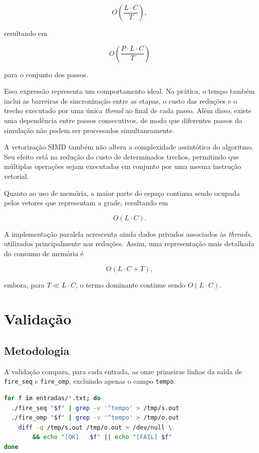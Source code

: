 \documentclass[11pt,a4paper]{article}
\begin{document}
$$
O\left(\frac{L \cdot C}{T}\right),
$$

resultando em

$$
O\left(\frac{P \cdot L \cdot C}{T}\right)
$$

para o conjunto dos passos.

Essa expressão representa um comportamento ideal. Na prática, o tempo também inclui as barreiras de sincronização entre as etapas, o custo das reduções e o trecho executado por uma única \emph{thread} ao final de cada passo. Além disso, existe uma dependência entre passos consecutivos, de modo que diferentes passos da simulação não podem ser processados simultaneamente.

A vetorização SIMD também não altera a complexidade assintótica do algoritmo. Seu efeito está na redução do custo de determinados trechos, permitindo que múltiplas operações sejam executadas em conjunto por uma mesma instrução vetorial.

Quanto ao uso de memória, a maior parte do espaço continua sendo ocupada pelos vetores que representam a grade, resultando em

$$
O(L \cdot C).
$$

A implementação paralela acrescenta ainda dados privados associados às \emph{threads}, utilizados principalmente nas reduções. Assim, uma representação mais detalhada do consumo de memória é

$$
O(L \cdot C + T),
$$

embora, para $T \ll L \cdot C$, o termo dominante continue sendo $O(L \cdot C)$.


\section{Validação}
\label{sec:validacao}

\subsection{Metodologia}

A validação compara, para cada entrada, as onze primeiras linhas da saída de \texttt{fire\_seq} e \texttt{fire\_omp}, excluindo apenas o campo \texttt{tempo}.

\begin{lstlisting}[language=bash,caption={Script de validação.},basicstyle=\ttfamily\footnotesize]
for f in entradas/*.txt; do
  ./fire_seq "$f" | grep -v '^tempo' > /tmp/s.out
  ./fire_omp "$f" | grep -v '^tempo' > /tmp/o.out
    diff -q /tmp/s.out /tmp/o.out > /dev/null \
        && echo "[OK]   $f" || echo "[FAIL] $f"
done
\end{lstlisting}
\end{document}
